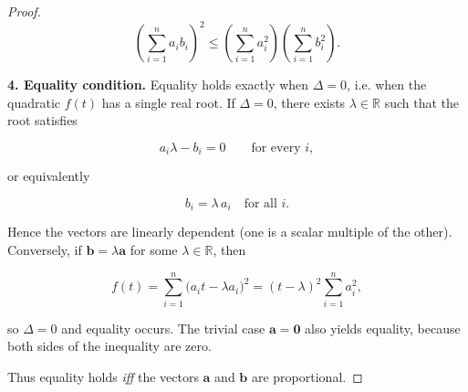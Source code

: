 \begin{proof}
\[
\boxed{\left(\sum_{i=1}^{n}a_{i}b_{i}\right)^{2}
      \le \left(\sum_{i=1}^{n}a_{i}^{2}\right)
         \left(\sum_{i=1}^{n}b_{i}^{2}\right)} .
\]

\medskip
\textbf{4. Equality condition.}  
Equality holds exactly when \(\Delta=0\), i.e. when the quadratic \(f(t)\) has a single real root.  
If \(\Delta=0\), there exists \(\lambda\in\mathbb R\) such that the root satisfies  

\[
a_{i}\lambda-b_{i}=0\qquad\text{for every }i,
\]

or equivalently  

\[
b_{i}= \lambda\,a_{i}\quad\text{for all }i .
\]

Hence the vectors are linearly dependent (one is a scalar multiple of the other).  
Conversely, if \(\mathbf b=\lambda\mathbf a\) for some \(\lambda\in\mathbb R\), then  

\[
f(t)=\sum_{i=1}^{n}\bigl(a_{i}t-\lambda a_{i}\bigr)^{2}
    =(t-\lambda)^{2}\sum_{i=1}^{n}a_{i}^{2},
\]

so \(\Delta=0\) and equality occurs.  
The trivial case \(\mathbf a=\mathbf 0\) also yields equality, because both sides of the inequality are zero.

Thus equality holds \emph{iff} the vectors \(\mathbf a\) and \(\mathbf b\) are proportional.

\end{proof}